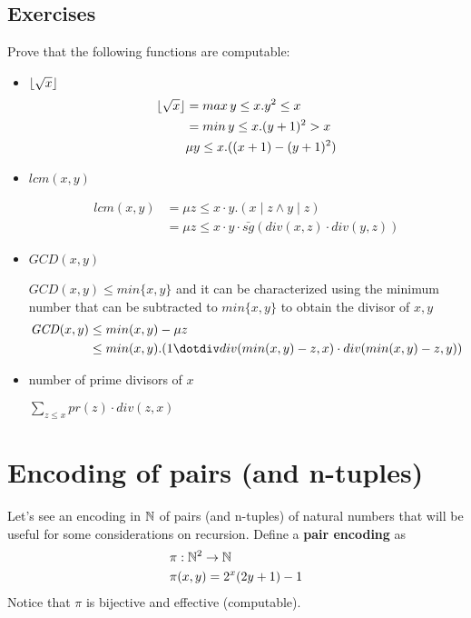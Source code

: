 \subsection{Exercises}
Prove that the following functions are computable:

\begin{itemize}
\item $\lfloor\sqrt{x}\rfloor$
  \begin{align*}
    \lfloor\sqrt{x}\rfloor &= max\, y\leq x . y^2 \leq x\\
                     &= min \, y \leq x . (y+1)^2 > x\\
                     &\mu y\leq x. ((x+1)-(y+1)^2)
  \end{align*}
  
\item $\mathit{lcm}(x,y)$

\begin{align*}
  lcm(x,y) &= \mu z \leq x\cdot y . (x \mid z \wedge y \mid z)\\
  &= \mu z \leq x\cdot y \cdot \bar{sg}(div(x,z)\cdot div(y,z))
\end{align*}
  
\item $\mathit{GCD}(x,y)$

  $\mathit{GCD}(x,y)\leq min\{x,y\}$ and it can be characterized using the minimum number that can be subtracted to $min\{x,y\}$ to obtain the divisor of $x,y$
  \begin{align*}
    \mathit{GCD}(x,y) &\leq min(x,y)-\mu z \\
                      &\leq min(x,y).(1\dotdiv div(min(x,y)-z,x)\cdot div(min(x,y)-z, y))
  \end{align*}
  

\item number of prime divisors of $x$

  $\sum_{z\leq x} pr(z)\cdot div(z,x)$
\end{itemize}

\section{Encoding of pairs (and n-tuples)}

Let's see an encoding in $\mathbb{N}$ of pairs (and n-tuples) of natural numbers that will be useful for some considerations on recursion.
Define a \textbf{pair encoding} as
\begin{align*}
  & \pi: \mathbb{N}^2\rightarrow\mathbb{N} \\
  & \pi(x,y) = 2^x(2y+1)-1
\end{align*}
Notice that $\pi$ is bijective and effective (computable).

